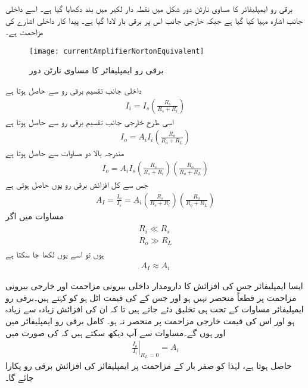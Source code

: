 برقی رو ایمپلیفائر کا مساوی نارٹن  دور شکل  میں نقطہ دار لکیر میں بند دکھایا گیا ہے۔ اسے داخلی جانب اشارہ  مہیا کیا گیا ہے جبکہ خارجی جانب اس پر برقی بار  لادا گیا ہے۔ پیدا کار داخلی اشارے کی مزاحمت  ہے۔
\begin{figure}
\centering
\texttt{[image: currentAmplifierNortonEquivalent]}
\caption{برقی رو ایمپلیفائر کا مساوی نارٹن دور}
\label{شکل_واپسی_رو_ایمپلیفائر_نارٹن_مساوی}
\end{figure}
داخلی جانب تقسیم برقی رو سے حاصل ہوتا ہے
\begin{align}
I_i = I_s  \left (\frac{R_s}{R_s+R_i} \right )
\end{align}
اسی طرح خارجی جانب تقسیم برقی رو سے حاصل ہوتا ہے
\begin{align} \label{مساوات_واپسی_رو_ایمپلیفائر_کی_خارجی_رو}
I_o = A_i I_i \left (\frac{R_o}{R_o+R_L} \right )
\end{align}
مندرجہ بالا دو مساوات سے حاصل ہوتا ہے
\begin{align}
I_o = A_i  I_s \left (\frac{R_s}{R_s+R_i} \right )  \left(\frac{R_o}{R_o+R_L} \right)
\end{align}
جس سے کل افزائش برقی رو  یوں حاصل ہوتی ہے
\begin{align} \label{مساوات_واپسی_رو_ایمپلیفائر_کی_افزائش}
A_I = \frac{I_o}{I_s}=A_i \left(\frac{R_s}{R_s+R_i} \right)  \left (\frac{R_o}{R_o+R_L} \right)
\end{align}
مساوات  میں اگر 
\begin{gather} \label{مساوات_واپسی_رو_ایمپلیفائر_کے_مزاحمت_کی_شرط}
\begin{aligned}
R_i \ll R_s \\
R_o \gg R_L
\end{aligned}
\end{gather}
ہوں تو اسے یوں لکھا جا سکتا ہے
\begin{align} \label{مساوات_واپسی_کامل_رو_ایمپلیفائر_کی_افزائش}
A_I  \approx A_i 
\end{align}

ایسا ایمپلیفائر جس کی افزائش  کا دارومدار داخلی بیرونی مزاحمت  اور خارجی بیرونی مزاحمت  پر قطعاً منحصر نہیں ہو اور جس کے  کی قیمت اٹل ہو کو  کہتے ہیں۔برقی رو ایمپلیفائر مساوات  کے تحت ہی تخلیق دئے جاتے ہیں تا کہ ان کی افزائش زیادہ سے زیادہ ہو اور اس کی قیمت خارجی مزاحمت  پر منحصر نہ ہو۔ کامل برقی رو ایمپلیفائر میں  اور  ہوں گے۔مساوات  سے آپ دیکھ سکتے ہیں کہ  کی صورت میں 
\begin{align} \label{مساوات_واپسی_صفر_بار_مزاحمت_پر_رو_کی_افزائش}
\left . \frac{I_o}{I_i} \right|_{R_L=0}=A_i
\end{align}
حاصل ہوتا ہے، لہٰذا  کو صفر بار کے مزاحمت پر ایمپلیفائر کی افزائش برقی رو پکارا جائے گا۔


